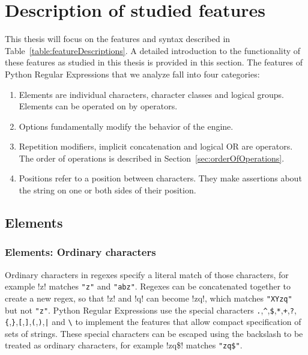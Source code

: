 \section{Description of studied features}
\label{sec:featureDescriptions}



This thesis will focus on the features and syntax described in Table~\ref{table:featureDescriptions}.  A detailed introduction to the functionality of these features as studied in this thesis is provided in this section.  The features of Python Regular Expressions that we analyze fall into four categories:

\begin{enumerate} \itemsep -1pt
\item{Elements are individual characters, character classes and logical groups.  Elements can be operated on by operators.}
\item{Options fundamentally modify the behavior of the engine.}
\item{Repetition modifiers, implicit concatenation and logical OR are operators. The order of operations is described in Section~\ref{sec:orderOfOperations}}.
\item{Positions refer to a position between characters.  They make assertions about the string on one or both sides of their position.}
\end{enumerate}

\subsection{Elements}

\subsubsection{Elements: Ordinary characters}

Ordinary characters in regexes specify a literal match of those characters, for example \cverb!z! matches \verb!"z"! and \verb!"abz"!.  Regexes can be concatenated together to create a new regex, so that \cverb!z! and \cverb!q! can become \cverb!zq!, which matches \verb!"XYzq"! but not \verb!"z"!.  Python Regular Expressions use the special characters \verb!.!,\verb!^!,\verb!$!,\verb!*!,\verb!+!,\verb!?!,\verb!{!,\verb!}!,\verb![!,\verb!]!,\verb!(!,\verb!)!,\verb!|! and \verb!\! to implement the features that allow compact specification of sets of strings.  These special characters can be escaped using the backslash to be treated as ordinary characters, for example \cverb!zq\$! matches \verb!"zq$"!.

